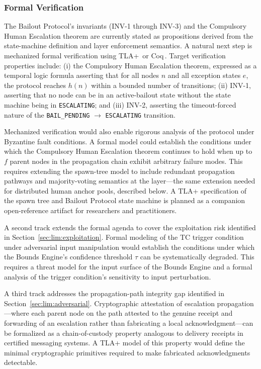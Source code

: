 \subsubsection{Formal Verification}
\label{sec:fw:verification}

The Bailout Protocol's invariants (INV-1 through INV-3) and the Compulsory Human Escalation theorem are currently stated as propositions derived from the state-machine definition and \fact{} layer enforcement semantics. A natural next step is mechanized formal verification using TLA+\,\cite{lamport2019tlaplus} or Coq\,\cite{coq2024}. Target verification properties include: (i) the Compulsory Human Escalation theorem, expressed as a temporal logic formula asserting that for all nodes $n$ and all exception states $e$, the protocol reaches $h(n)$ within a bounded number of transitions; (ii) INV-1, asserting that no node can be in an active-bailout state without the state machine being in \texttt{ESCALATING}; and (iii) INV-2, asserting the timeout-forced nature of the \texttt{BAIL\_PENDING} $\rightarrow$ \texttt{ESCALATING} transition.

Mechanized verification would also enable rigorous analysis of the protocol under Byzantine fault conditions. A formal model could establish the conditions under which the Compulsory Human Escalation theorem continues to hold when up to $f$ parent nodes in the propagation chain exhibit arbitrary failure modes. This requires extending the spawn-tree model to include redundant propagation pathways and majority-voting semantics at the \fact{} layer---the same extension needed for distributed human anchor pools, described below. A TLA+ specification of the \bxthree{} spawn tree and Bailout Protocol state machine is planned as a companion open-reference artifact for researchers and practitioners.

A second track extends the formal agenda to cover the exploitation risk identified in Section~\ref{sec:lim:exploitation}. Formal modeling of the TC trigger condition under adversarial input manipulation would establish the conditions under which the Bounds Engine's confidence threshold $\tau$ can be systematically degraded. This requires a threat model for the input surface of the Bounds Engine and a formal analysis of the trigger condition's sensitivity to input perturbation.

A third track addresses the propagation-path integrity gap identified in Section~\ref{sec:lim:adversarial}. Cryptographic attestation of escalation propagation---where each parent node on the path attested to the genuine receipt and forwarding of an escalation rather than fabricating a local acknowledgment---can be formalized as a chain-of-custody property analogous to delivery receipts in certified messaging systems. A TLA+ model of this property would define the minimal cryptographic primitives required to make fabricated acknowledgments detectable.

